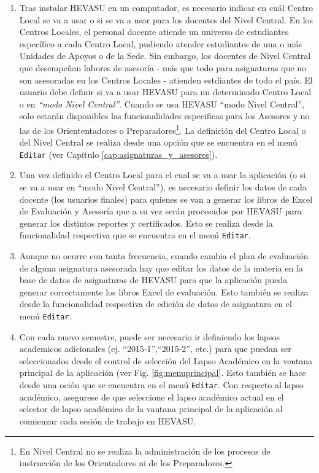 \documentclass[letterpaper,12pt]{book}
\begin{document}
\begin{enumerate}
	\item Tras instalar HEVASU en un computador, es necesario indicar en cuál Centro Local se va a usar o si se va a usar para los docentes del Nivel Central. En los Centros Locales, el personal docente atiende un universo de estudiantes específico a cada Centro Local, pudiendo atender estudiantes de una o más Unidades de Apoyos o de la Sede. Sin embargo, los docentes de Nivel Central que desempeñan labores de asesoría - más que todo para asignaturas que no son asesoradas en los Centros Locales - atienden estdiantes de todo el país. El usuario debe definir si va a usar HEVASU para un determinado Centro Local o en \emph{``modo Nivel Central''}\label{concepto:modo_NC}. Cuando se usa HEVASU ``modo Nivel Central'', solo estarán disponibles las funcionalidades especificas para los Asesores y no las de los Oriententadores o Preparadores\footnote{En Nivel Central no se realiza la administración de los procesos de instrucción de los Orientadores ni de los Preparadores.}.  La definición del Centro Local o del Nivel Central se realiza desde una opción que se encuentra en el menú \texttt{Editar} (ver Capítulo \ref{cap:asignaturas_y_asesores}).
	\item Una vez definido el Centro Local para el cual se va a usar la aplicación (o si se va a usar en ``modo Nivel Central''), es necesario definir los datos de cada docente (los usuarios finales) para quienes se van a generar los libros de Excel de Evaluación y Asesoría que a su vez serán procesados por HEVASU para generar los distintos reportes y certificados. Esto se realiza desde la funcionalidad respectiva que se encuentra en el menú \texttt{Editar}.
	\item Aunque no ocurre con tanta frecuencia, cuando cambia el plan de evaluación de alguna asignatura asesorada hay que editar los datos de la materia en la base de datos de asignaturas de HEVASU para que la aplicación pueda generar correctamente los libros Excel de evaluación. Esto también se realiza desde la funcionalidad respectiva de edición de datos de asignatura en el menú \texttt{Editar}. 
	\item Con cada nuevo semestre, puede ser necesario ir definiendo los lapsos academicos adicionales (ej. ``2015-1'',``2015-2'', etc.) para que puedan ser seleccionados desde el control de selección del Lapso Académico en la ventana principal de la aplicación (ver Fig. \ref{fig:menuprincipal}. Esto también se hace desde una oción que se encuentra en el menú \texttt{Editar}.  Con respecto al lapso académico, asegurese de que seleccione el lapso académico actual en el selector de lapso académico de la vantana principal de la aplicación al comienzar cada sesión de trabajo en HEVASU.

\end{enumerate}
\end{document}

